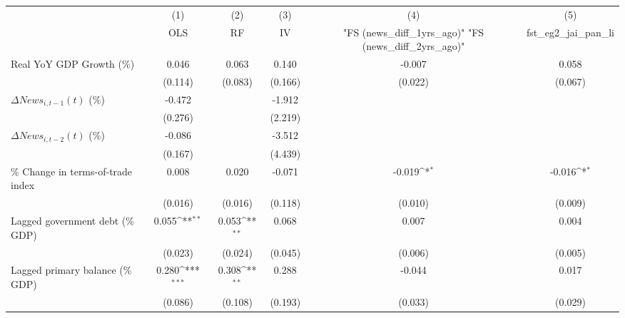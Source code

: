 {
\def\sym#1{\ifmmode^{#1}\else\(^{#1}\)\fi}
\begin{tabular}{l*{5}{c}}
\toprule
                    &\multicolumn{1}{c}{(1)}&\multicolumn{1}{c}{(2)}&\multicolumn{1}{c}{(3)}&\multicolumn{1}{c}{(4)}&\multicolumn{1}{c}{(5)}\\
                    &\multicolumn{1}{c}{OLS}&\multicolumn{1}{c}{RF}&\multicolumn{1}{c}{IV}&\multicolumn{1}{c}{ "FS (news_diff_1yrs_ago)"  "FS (news_diff_2yrs_ago)" }&\multicolumn{1}{c}{fst_eg2_jai_pan_li}\\
\midrule
Real YoY GDP Growth (\%)&       0.046         &       0.063         &       0.140         &      -0.007         &       0.058         \\
                    &     (0.114)         &     (0.083)         &     (0.166)         &     (0.022)         &     (0.067)         \\
\addlinespace
$ \Delta News_{i,t-1}(t)$ (\%)&      -0.472         &                     &      -1.912         &                     &                     \\
                    &     (0.276)         &                     &     (2.219)         &                     &                     \\
\addlinespace
$ \Delta News_{i,t-2}(t)$ (\%)&      -0.086         &                     &      -3.512         &                     &                     \\
                    &     (0.167)         &                     &     (4.439)         &                     &                     \\
\addlinespace
\% Change in terms-of-trade index&       0.008         &       0.020         &      -0.071         &      -0.019\sym{*}  &      -0.016\sym{*}  \\
                    &     (0.016)         &     (0.016)         &     (0.118)         &     (0.010)         &     (0.009)         \\
\addlinespace
Lagged government debt (\% GDP)&       0.055\sym{**} &       0.053\sym{**} &       0.068         &       0.007         &       0.004         \\
                    &     (0.023)         &     (0.024)         &     (0.045)         &     (0.006)         &     (0.005)         \\
\addlinespace
Lagged primary balance (\% GDP)&       0.280\sym{***}&       0.308\sym{**} &       0.288         &      -0.044         &       0.017         \\
                    &     (0.086)         &     (0.108)         &     (0.193)         &     (0.033)         &     (0.029)         \\

\end{tabular}}
